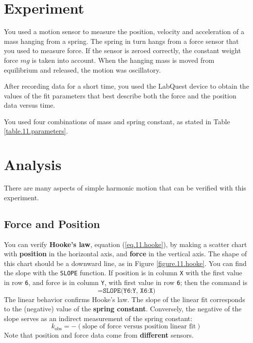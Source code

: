 \section{Experiment}
You used a motion sensor to measure the position, velocity and acceleration of a mass hanging from a spring. The spring in turn hangs from a force sensor that you used to measure force. If the sensor is zeroed correctly, the constant weight force $mg$ is taken into account. When the hanging mass is moved from equilibrium and released, the motion was oscillatory.

After recording data for a short time, you used the LabQuest device to obtain the values of the fit parameters that best describe both the force and the position data versus time.

You used four combinations of mass and spring constant, as stated in Table \ref{table.11.parameters}.
\section{Analysis}
There are many aspects of simple harmonic motion that can be verified with this experiment.
\subsection{Force and Position}
You can verify \textbf{Hooke's law}, equation (\ref{eq.11.hooke}), by making a scatter chart with \textbf{position} in the horizontal axis, and \textbf{force} in the vertical axis. The shape of this chart should be a downward line, as in Figure \ref{figure.11.hooke}. You can find the slope with the \texttt{SLOPE} function. If position is in column \texttt{X} with the first value in row \texttt{6}, and force is in column \texttt{Y}, with first value in row \texttt{6}; then the command is
\begin{equation}
    \texttt{=SLOPE(Y6:Y, X6:X)}
\end{equation}
The linear behavior confirms Hooke's law. The slope of the linear fit corresponds to the (negative) value of the \textbf{spring constant}. Conversely, the negative of the slope serves as an indirect measurement of the spring constant:
\begin{equation}
    k_{\text{obs}} = - (\text{slope of force versus position linear fit})
\end{equation}
Note that position and force data come from \textbf{different} sensors.
